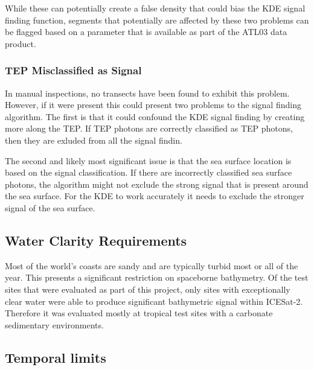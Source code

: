 While these can potentially create a false density that could bias the KDE signal finding function, segments that potentially are affected by these two problems can be flagged based on a parameter that is available as part of the ATL03 data product. 

\subsubsection{TEP Misclassified as Signal}

In manual inspections, no transects have been found to exhibit this problem. However, if it were present this could present two problems to the signal finding algorithm. The first is that it could confound the KDE signal finding by creating more along the TEP. If TEP photons are correctly classified as TEP photons, then they are exluded from all the signal findin. 

The second and likely most significant issue is that the sea surface location is based on the signal classification. If there are incorrectly classified sea surface photons, the algorithm might not exclude the strong signal that is present around the sea surface. For the KDE to work accurately it needs to exclude the stronger signal of the sea surface. 




\subsection{Water Clarity Requirements}

Most of the world's coasts are sandy and are typically turbid most or all of the year. This presents a significant restriction on spaceborne bathymetry. Of the test sites that were evaluated as part of this project, only sites with exceptionally clear water were able to produce significant bathymetric signal within ICESat-2. Therefore it was evaluated mostly at tropical test sites with a carbonate sedimentary environments.  

\subsection{Temporal limits}


